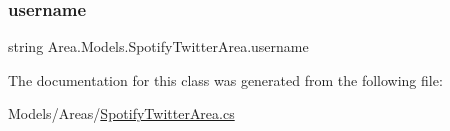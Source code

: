 \mbox{\label{classArea_1_1Models_1_1SpotifyTwitterArea_aae8f07752b2dba87df70bec18efb42c5}} 
\subsubsection{\texorpdfstring{username}{username}}
{\footnotesize\ttfamily string Area.\+Models.\+Spotify\+Twitter\+Area.\+username\hspace{0.3cm}{\ttfamily [private]}}



The documentation for this class was generated from the following file\+:\begin{DoxyCompactItemize}
\item 
Models/\+Areas/\mbox{\hyperlink{SpotifyTwitterArea_8cs}{Spotify\+Twitter\+Area.\+cs}}\end{DoxyCompactItemize}
